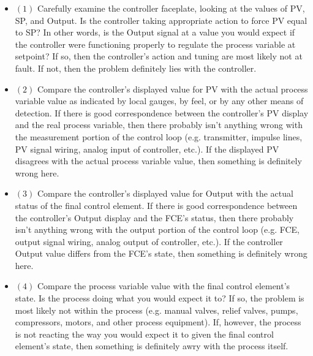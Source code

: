 \begin{itemize}
\begin{itemize}
\item{$(1)$}  Carefully examine the controller faceplate, looking at the values of PV, SP, and Output.  Is the controller taking appropriate action to force PV equal to SP?  In other words, is the Output signal at a value you would expect if the controller were functioning properly to regulate the process variable at setpoint?  If so, then the controller's action and tuning are most likely not at fault.  If not, then the problem definitely lies with the controller.
\item{$(2)$}  Compare the controller's displayed value for PV with the actual process variable value as indicated by local gauges, by feel, or by any other means of detection.  If there is good correspondence between the controller's PV display and the real process variable, then there probably isn't anything wrong with the measurement portion of the control loop (e.g. transmitter, impulse lines, PV signal wiring, analog input of controller, etc.).  If the displayed PV disagrees with the actual process variable value, then something is definitely wrong here.
\item{$(3)$}  Compare the controller's displayed value for Output with the actual status of the final control element.  If there is good correspondence between the controller's Output display and the FCE's status, then there probably isn't anything wrong with the output portion of the control loop (e.g. FCE, output signal wiring, analog output of controller, etc.).  If the controller Output value differs from the FCE's state, then something is definitely wrong here.
\item{$(4)$}  Compare the process variable value with the final control element's state.  Is the process doing what you would expect it to?  If so, the problem is most likely not within the process (e.g. manual valves, relief valves, pumps, compressors, motors, and other process equipment).  If, however, the process is not reacting the way you would expect it to given the final control element's state, then something is definitely awry with the process itself.
\end{itemize}

















\end{itemize}
